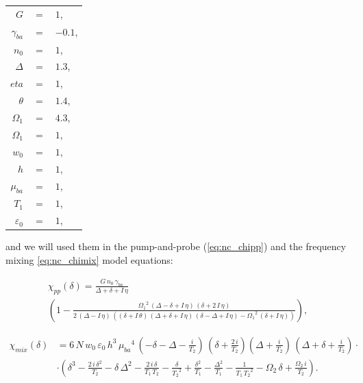 \documentclass[12pt,twoside,a4paper]{article}
\numberwithin{equation}{subsection}
\numberwithin{figure}{subsection}
\begin{document}
\begin{tabular} { r c l}
  $G$             & $=$ & $1$, \\
  $\gamma_{ba}$   & $=$ & $-0.1$, \\ 
  $n_0$           & $=$ & $1$, \\
  $\Delta$        & $=$ & $1.3$, \\
  $eta$           & $=$ & $1$, \\
  $\theta$        & $=$ & $1.4$, \\
  $\Omega_1$      & $=$ & $4.3$, \\
  $\Omega_1$      & $=$ & $1$, \\
  $w_0$           & $=$ & $1$, \\
  $h$             & $=$ & $1$, \\
  $\mu_{ba}$      & $=$ & $1$, \\
  $T_1$           & $=$ & $1$, \\
  $\varepsilon_0$ & $=$ & $1$, \\  
\end{tabular}

and we will used them in the pump-and-probe (\ref{eq:nc_chipp}) and the frequency mixing \ref{eq:nc_chimix} model equations:

\begin{multline} \label{eq:nc_chipp}
  \chi_{pp}(\delta ) = 
  \frac {G\,{n_{0}}\,{\gamma_{ba}}}{\Delta  + \delta  + I\,\eta }
  \\ 
  \left(
      1 - \frac{{\Omega_{1}}^{2}\,(\Delta - \delta  + I\,\eta )\,(\delta  + 2\,I\,\eta )}
                {2\,(\Delta  - I\,\eta )\,((\delta  + I\,\theta)\,(\Delta  + \delta  + I\,\eta )\, (\delta  - \Delta  + I\,\eta ) 
                   - {\Omega_{1}}^{2}\,(\delta  + I\,\eta ))} 
  \right) ,
\end{multline}

\begin{align} \label{eq:nc_chimix}
  {\chi_{mix}}(\delta ) 
    &= 6\,N\,{w_{0}}\,\varepsilon_0\,h^{3}\,{\mu_{\mathit{ba}}}^{4}
      \,( - \delta  - \Delta  - \frac {i}{{T_{2}}})
      \,(\delta  + \frac{2\,i}{{T_{2}}}) (\Delta  + \frac {i}{{T_{2}}})\,(\Delta  + \delta  + \frac{i}{{T_{2}}})\cdot \\
    & \cdot	(\delta ^{3} - \frac {2\,i\,\delta ^{2}}{{T_{2}}} - \delta \,\Delta ^{2} - \frac {2\,i\,\delta }{{T_{1}}\,{T_{2}}}
      - \frac {\delta }{{T_{2}}^{2}} + \frac {\delta ^{2}}{{T_{1}}} - \frac {\Delta ^{2}}{{T_{1}}} - \frac {1}{{T_{1}}\,{T_{2}}^{2}} -
      {\Omega_{2}}\,\delta  + \frac {{\Omega_{2}}\,i}{{T_{2}}}) .
  \nonumber
\end{align}
\end{document}
